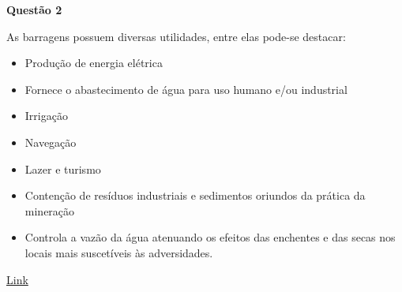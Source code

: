 \item[]\textbf{Questão 2}

As barragens possuem diversas utilidades, entre elas pode-se destacar:

\begin{itemize}
	\item Produção de energia elétrica
	\item Fornece o abastecimento de água para uso humano e/ou industrial
	\item Irrigação
	\item Navegação
	\item Lazer e turismo
	\item Contenção de resíduos industriais e sedimentos oriundos da prática da mineração
	\item Controla a vazão da água atenuando os efeitos das enchentes e das secas nos locais mais suscetíveis às adversidades.
\end{itemize}

\href{https://institutominere.com.br/blog/principais-usos-das-barragens-e-suas-aplicabilidades}{Link}